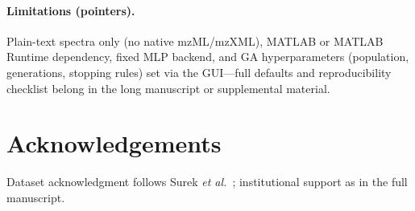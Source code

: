 \documentclass[preprint,12pt]{elsarticle}
\begin{document}
\paragraph{Limitations (pointers).}
Plain-text spectra only (no native mzML/mzXML), MATLAB or MATLAB Runtime dependency, fixed MLP backend, and GA hyperparameters (population, generations, stopping rules) set via the GUI---full defaults and reproducibility checklist belong in the long manuscript or supplemental material.

\section*{Acknowledgements}
Dataset acknowledgment follows Surek \textit{et al.}~\cite{Surek2010}; institutional support as in the full manuscript.



\end{document}
